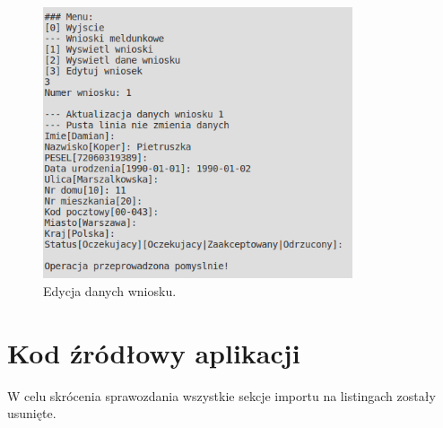 \documentclass[12pt]{article}
\begin{document}
\begin{figure}[H]
    \centering
    \includegraphics[width=\linewidth,height=8cm, keepaspectratio]{common/use3}
    \caption{Edycja danych wniosku.}
    \label{fig:obrazek3}
\end{figure}
\clearpage
\section{Kod źródłowy aplikacji}
W celu skrócenia sprawozdania wszystkie sekcje importu na listingach zostały usunięte.










\end{document}

